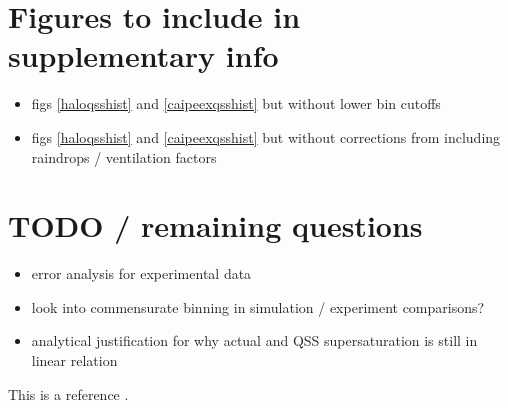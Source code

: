 \documentclass{article}
\begin{document}
\section{Figures to include in supplementary info}
\begin{itemize}
	\item figs \ref{haloqsshist} and \ref{caipeexqsshist} but without lower bin cutoffs
	\item figs \ref{haloqsshist} and \ref{caipeexqsshist} but without corrections from including raindrops / ventilation factors
\end{itemize}
\section{TODO / remaining questions}
\begin{itemize}
	\item error analysis for experimental data
	\item look into commensurate binning in simulation / experiment comparisons?
	\item analytical justification for why actual and QSS supersaturation is still in linear relation
\end{itemize}
This is a reference \cite{Fan2018}.



\end{document}
